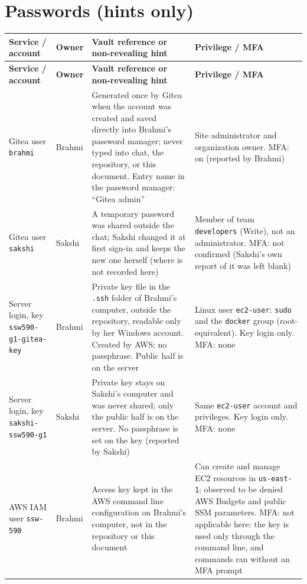 \section{Passwords (hints only)}
\begin{tabularx}{\linewidth}{L{3.0cm}L{1.8cm}YL{3.2cm}}
\caption{Passwords and keys (hints only; no secrets are recorded)\label{Table:Passwords}}\\
\toprule \textbf{Service / account} & \textbf{Owner} & \textbf{Vault reference or non-revealing hint} & \textbf{Privilege / MFA}\\ \midrule
\endfirsthead
\toprule \textbf{Service / account} & \textbf{Owner} & \textbf{Vault reference or non-revealing hint} & \textbf{Privilege / MFA}\\ \midrule
\endhead \bottomrule \endlastfoot
Gitea user \texttt{brahmi} & Brahmi & Generated once by Gitea when the account was created and saved directly into Brahmi's password manager; never typed into chat, the repository, or this document. Entry name in the password manager: ``Gitea admin'' & Site administrator and organization owner. MFA: on (reported by Brahmi)\\
Gitea user \texttt{sakshi} & Sakshi & A temporary password was shared outside the chat; Sakshi changed it at first sign-in and keeps the new one herself (where is not recorded here) & Member of team \texttt{developers} (Write), not an administrator. MFA: not confirmed (Sakshi's own report of it was left blank)\\
Server login, key \texttt{ssw590-g1-gitea-key} & Brahmi & Private key file in the \texttt{.ssh} folder of Brahmi's computer, outside the repository, readable only by her Windows account. Created by AWS; no passphrase. Public half is on the server & Linux user \texttt{ec2-user}: \texttt{sudo} and the \texttt{docker} group (root-equivalent). Key login only. MFA: none\\
Server login, key \texttt{sakshi-ssw590-g1} & Sakshi & Private key stays on Sakshi's computer and was never shared; only the public half is on the server. No passphrase is set on the key (reported by Sakshi) & Same \texttt{ec2-user} account and privileges. Key login only. MFA: none\\
AWS IAM user \texttt{ssw-590} & Brahmi & Access key kept in the AWS command line configuration on Brahmi's computer, not in the repository or this document & Can create and manage EC2 resources in \texttt{us-east-1}; observed to be denied AWS Budgets and public SSM parameters. MFA: not applicable here: the key is used only through the command line, and commands ran without an MFA prompt\\

\end{tabularx}
